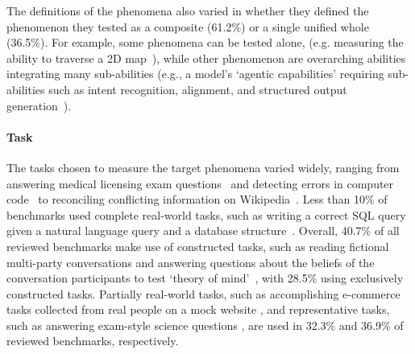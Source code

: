 The definitions of the phenomena also varied in whether they defined the phenomenon they tested as a composite (61.2\%) or a single unified whole  (36.5\%). For example, some phenomena can be tested alone, (e.g. measuring the ability to traverse a 2D map~\cite{nasirGameTraversalBenchmarkEvaluatingPlanning2024a}), while other phenomenon are overarching abilities integrating many sub-abilities (e.g., a model's `agentic capabilities' requiring sub-abilities such as intent recognition, alignment, and structured output generation~\cite{liuAgentBenchEvaluatingLLMs2024}).



\paragraph{\textcolor{task}{Task}} 
The tasks chosen to measure the target phenomena varied widely, ranging from answering medical licensing exam questions~\cite{ouyangCliMedBenchLargescaleChinese2024a} and detecting errors in computer code~\cite{shahStackEvalBenchmarkingLlms2024a} to reconciling conflicting information on Wikipedia~\cite{houWikiContradictBenchmarkEvaluating2024a}. Less than 10\% of benchmarks used complete real-world tasks, such as writing a correct SQL query given a natural language query and a database structure~\cite{changDrspiderDiagnosticEvaluation2023}.
Overall, 40.7\% of all reviewed benchmarks make use of constructed tasks, such as reading fictional multi-party conversations and answering questions about the beliefs of the conversation participants to test `theory of mind'~\cite{kimFANToMBenchmarkStresstesting2023}, with 28.5\% using exclusively constructed tasks. 
Partially real-world tasks, such as accomplishing e-commerce tasks collected from real people on a mock website \cite{yaoWebShopScalableRealworld2022a}, and representative tasks, such as answering exam-style science questions \cite{wangSciBenchEvaluatingCollegelevel2024}, are used in 32.3\% and 36.9\% of reviewed benchmarks, respectively.

